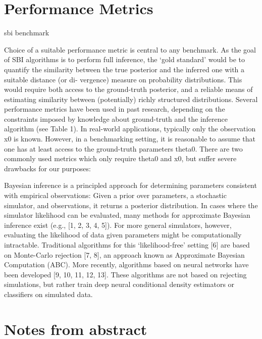 \section{Performance Metrics}

sbi benchmark 



Choice of a suitable performance metric is central to any benchmark. As the goal of SBI algorithms is to perform full inference, the ‘gold standard’ would be to quantify the similarity between the true posterior and the inferred one with a suitable distance (or di- vergence) measure on probability distributions. This would require both access to the ground-truth posterior, and a reliable means of estimating similarity between (potentially) richly structured distributions. Several performance metrics have been used in past research, depending on the constraints imposed by knowledge about ground-truth and the inference algorithm (see Table 1). In real-world applications, typically only the observation x0 is known. However, in a benchmarking setting, it is reasonable to assume that one has at least access to the ground-truth parameters theta0. There are two commonly used metrics which only require theta0 and
x0, but suffer severe drawbacks for our purposes:


Bayesian inference is a principled approach for determining parameters consistent with empirical observations: Given a prior over parameters, a stochastic simulator, and observations, it returns a posterior distribution. In cases where the simulator likelihood can be evaluated, many methods for approximate Bayesian
inference exist (e.g., [1, 2, 3, 4, 5]). For more general simulators, however, evaluating the likelihood of data
given parameters might be computationally intractable. Traditional algorithms for this ‘likelihood-free’
setting [6] are based on Monte-Carlo rejection [7, 8], an approach known as Approximate Bayesian Computation (ABC). More recently, algorithms based on neural networks have been developed [9, 10, 11, 12, 13].
These algorithms are not based on rejecting simulations, but rather train deep neural conditional density estimators or classifiers on simulated data. 


\section{Notes from abstract}

